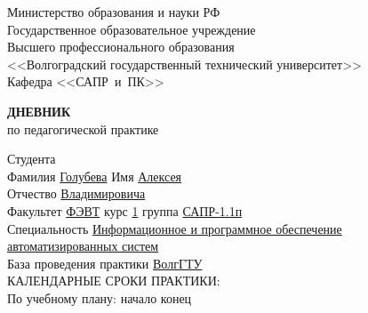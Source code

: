 \documentclass[a4paper, 14pt]{extreport}
\begin{document}
    \begin{titlepage}
        \begin{center}
            Министерство образования и науки РФ \\
            Государственное образовательное учреждение\\
            Высшего профессионального образования\\
            <<Волгоградский государственный технический университет>>\\
            Кафедра <<САПР~и~ПК>>
        \end{center}
        \vspace{2cm}
        \begin{center}
            \large \textbf{ДНЕВНИК} \\
            по педагогической практике
        \end{center}
        \begin{flushleft}
            Студента\\
            Фамилия \underline{Голубева\hspace{3.1cm}} 
            Имя \underline{Алексея\hspace{2.1cm}}\\
            Отчество \underline{Владимировича\hspace{1.6cm}}\\
            Факультет \underline{ФЭВТ\hspace{3.45cm}} курс \underline{1\hspace{1.5cm}} 
            группа \underline{САПР-1.1п\hspace{2.6cm}}\\
            \vspace{1cm}
            Специальность \underline{Информационное и программное обеспечение\hspace{3.4cm}}\\
            \underline{автоматизированных систем\hspace{10.85cm}}\\
            База проведения практики \underline{ВолгГТУ\hspace{9.1cm}}\\
            \vspace{1cm}
            КАЛЕНДАРНЫЕ СРОКИ ПРАКТИКИ:\\
            По учебному плану: \hspace{0.2cm} начало \underline{\hspace{4.5cm}} 
            конец \underline{\hspace{4.5cm}}\\

\end{flushleft}
\end{titlepage}
\end{document}
